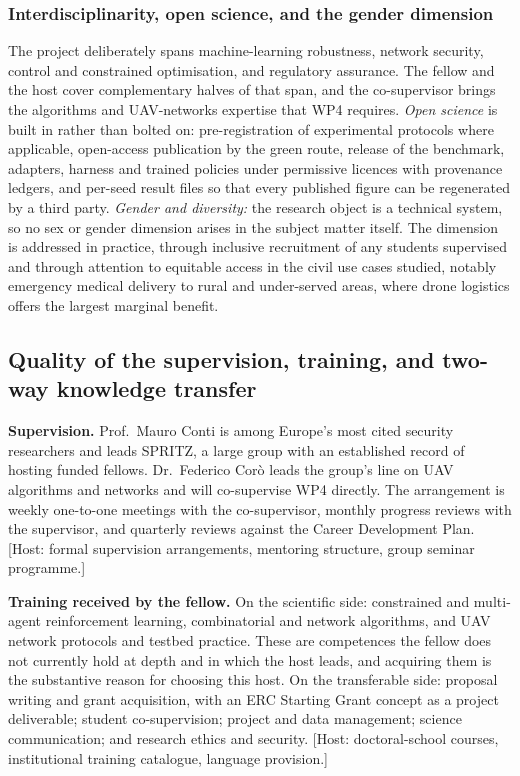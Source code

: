 \documentclass[11pt,a4paper]{article}
\begin{document}
\subsubsection{Interdisciplinarity, open science, and the gender dimension}
The project deliberately spans machine-learning robustness, network security, control and constrained optimisation, and regulatory assurance. The fellow and the host cover complementary halves of that span, and the co-supervisor brings the algorithms and UAV-networks expertise that WP4 requires. \emph{Open science} is built in rather than bolted on: pre-registration of experimental protocols where applicable, open-access publication by the green route, release of the benchmark, adapters, harness and trained policies under permissive licences with provenance ledgers, and per-seed result files so that every published figure can be regenerated by a third party. \emph{Gender and diversity:} the research object is a technical system, so no sex or gender dimension arises in the subject matter itself. The dimension is addressed in practice, through inclusive recruitment of any students supervised and through attention to equitable access in the civil use cases studied, notably emergency medical delivery to rural and under-served areas, where drone logistics offers the largest marginal benefit.

\subsection{Quality of the supervision, training, and two-way knowledge transfer}
\textbf{Supervision.} Prof.\ Mauro Conti is among Europe's most cited security researchers and leads SPRITZ, a large group with an established record of hosting funded fellows. Dr.\ Federico Cor\`o leads the group's line on UAV algorithms and networks and will co-supervise WP4 directly. The arrangement is weekly one-to-one meetings with the co-supervisor, monthly progress reviews with the supervisor, and quarterly reviews against the Career Development Plan. [Host: formal supervision arrangements, mentoring structure, group seminar programme.]

\textbf{Training received by the fellow.} On the scientific side: constrained and multi-agent reinforcement learning, combinatorial and network algorithms, and UAV network protocols and testbed practice. These are competences the fellow does not currently hold at depth and in which the host leads, and acquiring them is the substantive reason for choosing this host. On the transferable side: proposal writing and grant acquisition, with an ERC Starting Grant concept as a project deliverable; student co-supervision; project and data management; science communication; and research ethics and security. [Host: doctoral-school courses, institutional training catalogue, language provision.]
\end{document}
